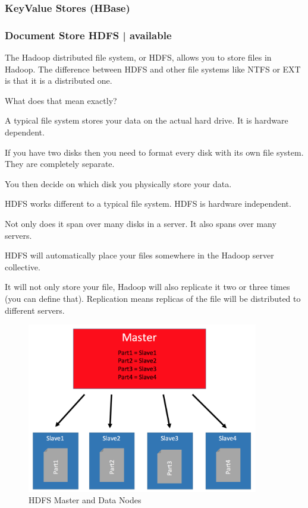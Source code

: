 \documentclass[12pt]{scrartcl} %
\begin{document}
\subsubsection{KeyValue Stores (HBase)}
\subsubsection{Document Store HDFS | available}

The Hadoop distributed file system, or HDFS, allows you to store files in Hadoop. The difference between HDFS and other file systems like NTFS or EXT is that it is a distributed one.

What does that mean exactly?

A typical file system stores your data on the actual hard drive. It is hardware dependent.

If you have two disks then you need to format every disk with its own file system. They are completely separate.

You then decide on which disk you physically store your data.

HDFS works different to a typical file system. HDFS is hardware independent.

Not only does it span over many disks in a server. It also spans over many servers.

HDFS will automatically place your files somewhere in the Hadoop server collective.

It will not only store your file, Hadoop will also replicate it two or three times (you can define that). Replication means replicas of the file will be distributed to different servers.

\begin{figure}[htbp]
  \centering
     \includegraphics[width=0.9\textwidth]{images/HDFS-Master-DataNodes}
  \caption{HDFS Master and Data Nodes}
  \label{fig:Bild1}
\end{figure}
\end{document}

